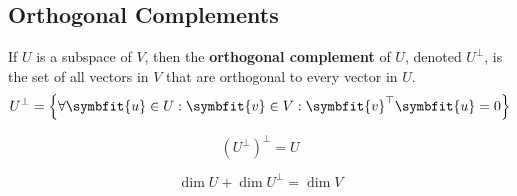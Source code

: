 \documentclass{article}
\begin{document}
\subsection{Orthogonal Complements}
\begin{definition}
    If \(U\) is a subspace of \(V\), then the
    \textbf{orthogonal complement} of \(U\), denoted \(U^{\perp}\), is
    the set of all vectors in \(V\) that are orthogonal to every vector
    in \(U\).
    \begin{equation*}
        U^{\perp} = \left\{ \forall \symbfit{u}\in U:\symbfit{v}\in V: \symbfit{v}^{\top}\symbfit{u}=0 \right\}
    \end{equation*}
\end{definition}
\begin{theorem}
    \begin{equation*}
        \left( U^{\perp} \right)^{\perp}=U
    \end{equation*}
\end{theorem}
\begin{theorem}
    \begin{equation*}
        \dim{U} + \dim{U^{\perp}} = \dim{V}
    \end{equation*}
\end{theorem}
\end{document}
